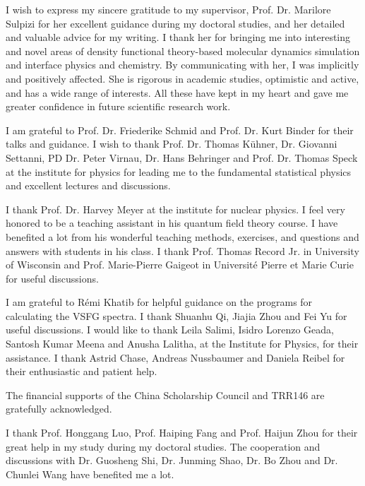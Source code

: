 \documentclass[
11pt, %
ngerman,
english, %
singlespacing, %
headsepline, %
]{MastersDoctoralThesis} %
\begin{document}
\begin{acknowledgements}
\addchaptertocentry{\acknowledgementname} %
I wish to express my sincere gratitude to my supervisor,
Prof. Dr. Marilore Sulpizi for her excellent guidance during my doctoral studies, and her detailed and valuable advice for my writing.
I thank her for bringing me into interesting and novel areas of density functional theory-based molecular dynamics simulation 
and interface physics and chemistry. By communicating with her, I was implicitly and positively affected. 
She is rigorous in academic studies, optimistic and active, and has a wide range of interests. 
All these have kept in my heart and gave me greater confidence in future scientific research work.

%
I am grateful to Prof. Dr. Friederike Schmid  and Prof. Dr. Kurt Binder for their talks and guidance.
I wish to thank Prof. Dr. Thomas Kühner, Dr. Giovanni Settanni, PD Dr. Peter
Virnau, Dr. Hans Behringer and Prof. Dr. Thomas Speck at the institute for
physics for leading me to the fundamental statistical physics and excellent lectures and discussions. 

%
I thank Prof. Dr. Harvey Meyer at the institute for nuclear physics. 
I feel very honored to be a teaching assistant in his quantum field theory course. 
I have benefited a lot from his wonderful teaching methods, exercises, and questions and answers with students in his class.
%
I thank Prof. Thomas Record Jr. in University of Wisconsin and Prof. Marie-Pierre Gaigeot in Universit{\'e} Pierre et Marie Curie for useful discussions.

%
I am grateful to R\'emi Khatib for helpful guidance on the programs for calculating the VSFG spectra. I thank Shuanhu Qi, Jiajia Zhou and Fei Yu for useful discussions. 
I would like to thank Leila Salimi, Isidro Lorenzo Geada, Santosh Kumar Meena and Anusha Lalitha, 
at the Institute for Physics, for their assistance.
%
I thank Astrid Chase, Andreas Nussbaumer and Daniela Reibel for their enthusiastic and patient help.

%
The financial supports of the China Scholarship Council and TRR146 are gratefully acknowledged.


%
I thank Prof. Honggang Luo, Prof. Haiping Fang and Prof. Haijun Zhou for their great help in my study during my doctoral studies. 
The cooperation and discussions with Dr. Guosheng Shi, Dr. Junming Shao, Dr. Bo Zhou and Dr. Chunlei Wang have benefited me a lot. 


\end{acknowledgements}
\end{document}
